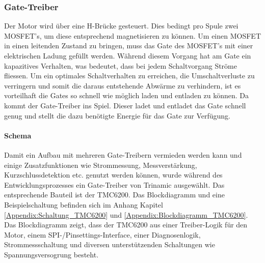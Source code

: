\subsubsection{Gate-Treiber}
\label{subsubsec:Gate-Treiber}


Der Motor wird über eine H-Brücke gesteuert. Dies bedingt pro Spule zwei MOSFET's, um diese entsprechend magnetisieren zu können. Um einen MOSFET in einen leitenden Zustand zu bringen, muss das Gate des MOSFET's mit einer elektrischen Ladung gefüllt werden. Während diesem Vorgang hat am Gate ein kapazitives Verhalten, was bedeutet, dass bei jedem Schaltvorgang Ströme fliessen. Um ein optimales Schaltverhalten zu erreichen, die Umschaltverluste zu verringern und somit die daraus entstehende Abwärme zu verhindern, ist es vorteilhaft die Gates so schnell wie möglich laden und entladen zu können. Da kommt der Gate-Treiber ins Spiel. Dieser ladet und entladet das Gate schnell genug und stellt die dazu benötigte Energie für das Gate zur Verfügung.

\paragraph{Schema}\mbox{}

Damit ein Aufbau mit mehreren Gate-Treibern vermieden werden kann und einige Zusatzfunktionen wie Strommessung, Messverstärkung, Kurzschlussdetektion etc. genutzt werden können, wurde während des Entwicklungsprozesses ein Gate-Treiber von Trinamic ausgewählt. Das entsprechende Bauteil ist der TMC6200. Das Blockdiagramm und eine Beispielschaltung befinden sich im Anhang Kapitel \ref{Appendix:Schaltung_TMC6200} und \ref{Appendix:Blockdiagramm_TMC6200}. Das Blockdiagramm zeigt, dass der TMC6200 aus einer Treiber-Logik für den Motor, einem SPI-/Pinsettings-Interface, einer Diagnosenlogik, Strommessschaltung und diversen unterstützenden Schaltungen wie Spannungsversogrung besteht.


